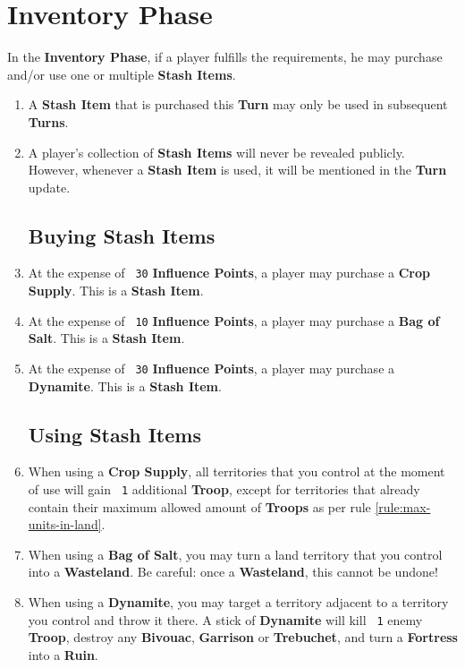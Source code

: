 \documentclass[10pt,openright,a4paper,openany]{article}
\newcommand{\num}[1]{\texttt{\color{purple} {#1}}}
\newcommand{\term}[1]{\textbf{\color{purple} #1}}
\begin{document}
\section{Inventory Phase}\label{sec:inventory}
In the \term{Inventory Phase}, if a player fulfills the requirements, he may purchase and/or use one or multiple \term{Stash Items}.
\begin{enumerate}
	\item A \term{Stash Item} that is purchased this \term{Turn} may only be used in subsequent \term{Turns}.
	\item A player's collection of \term{Stash Items} will never be revealed publicly. However, whenever a \term{Stash Item} is used, it will be mentioned in the \term{Turn} update.
	\subsection*{Buying Stash Items}

	\item At the expense of \num{30} \term{Influence Points}, a player may purchase a \term{Crop Supply}. This is a \term{Stash Item}.
	\item At the expense of \num{10} \term{Influence Points}, a player may purchase a \term{Bag of Salt}. This is a \term{Stash Item}.
	\item At the expense of \num{30} \term{Influence Points}, a player may purchase a \term{Dynamite}. This is a \term{Stash Item}.
	\subsection*{Using Stash Items}

	\item When using a \term{Crop Supply}, all territories that you control at the moment of use will gain \num{1} additional \term{Troop}, except for territories that already contain their maximum allowed amount of \term{Troops} as per rule \ref{rule:max-units-in-land}.
	\item When using a \term{Bag of Salt}, you may turn a land territory that you control into a \term{Wasteland}. Be careful: once a \term{Wasteland}, this cannot be undone!
	\item When using a \term{Dynamite}, you may target a territory adjacent to a territory you control and throw it there. A stick of \term{Dynamite} will kill \num{1} enemy \term{Troop}, destroy any \term{Bivouac}, \term{Garrison} or \term{Trebuchet}, and turn a \term{Fortress} into a \term{Ruin}.
\end{enumerate}
\end{document}
